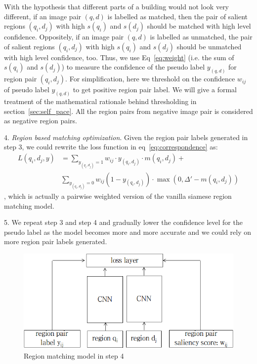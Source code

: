 With the hypothesis that different parts of a building would not look very different, if an image pair $(q,d)$ is labelled as matched, then the pair of salient regions $(q_i, d_j)$ with high $s(q_i)$ and $s(d_j)$ should be matched with high level confidence. 
Oppositely,  if an image pair $(q,d)$ is labelled as unmatched, the pair of salient regions $(q_i, d_j)$ with high $s(q_i)$ and $s(d_j)$ should be unmatched with high level confidence, too. 
Thus, we use Eq~\eqref{eq:weight} (i.e. the sum of $s(q_i)$ and $s(d_j)$) to measure the confidence of the pseudo label $y_{(q,d)}$ for region pair $(q_i, d_j)$.
For simplification, here we threshold on the confidence $w_{ij}$ of pseudo label $y_{(q, d)}$ to get positive region pair label. We will give a formal treatment of the mathematical rationale behind thresholding in section~\ref{sec:self_pace}. All the region pairs from negative image pair is considered as negative region pairs. 

4. \emph{Region based matching optimization}. Given the region pair labels generated in step 3, we could rewrite the loss function in eq~\eqref{eq:correspondence} as:
\small
\begin{align}
L(q_i, d_j, y) &= \sum_{y_{(q_i, d_j)} = 1} w_{ij} \cdot y_{(q_i, d_j)}\cdot m(q_i, d_j) + \\
& \sum_{y_{(q_i, d_j)} = 0} w_{ij} (1-y_{(q_i, d_j)})\cdot \max(0, \Delta' - m(q_i,d_j))
\label{eq:region_loss_sum}
\end{align}
\normalsize
, which is actually a pairwise weighted version of the vanilla siamese region matching model. 

5. We repeat step 3 and step 4 and gradually lower the confidence level for the pseudo label as the model becomes more and more accurate and we could rely on more region pair labels generated. 

\begin{figure}[!t]
\includegraphics[width=0.9\linewidth]{img/siamese_cj}
\caption{Region matching model in step 4}
\label{fig:siamese}
\end{figure}

